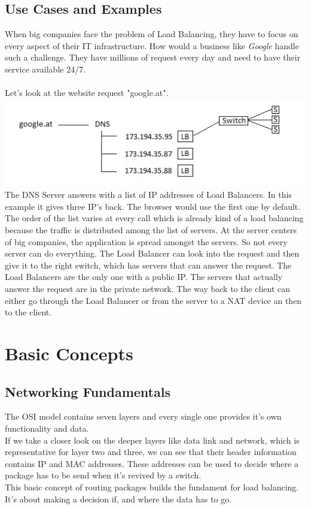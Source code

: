 \documentclass[12p]{article}
\begin{document}
	\subsection{Use Cases and Examples}
	When big companies face the problem of Load Balancing, they have to focus on every aspect of their IT infrastructure. How would a business like \textit{Google} handle such a challenge. They have millions of request every day and need to have their service available 24/7. \\\\
	Let's look at the website request "google.at".\\
	\includegraphics[width=\textwidth]{example}
 	The DNS Server answers with a list of IP addresses of Load Balancers. In this example it gives three IP's back. The browser would use the first one by default. The order of the list varies at every call which is already kind of a load balancing because the traffic is distributed among the list of servers. At the server centers of big companies, the application is spread amongst the servers. So not every server can do everything. The Load Balancer can look into the request and then give it to the right switch, which has servers that can answer the request. The Load Balancers are the only one with a public IP. The servers that actually answer the request are in the private network. The way back to the client can either go through the Load Balancer or from the server to a NAT device an then to the client.
	
	\newpage
	\section{Basic Concepts}
	\subsection{Networking Fundamentals}
	The OSI model contains seven layers and every single one provides it's own functionality and data.\\
	If we take a closer look on the deeper layers like data link and network, which is representative for layer two and three, we can see that their header information contains IP and MAC addresses. These addresses can be used to decide where a package has to be send when it's revived by a switch.\\
	This basic concept of routing packages builds the fundament for load balancing. It's about making a decision if, and where the data has to go. \cite{lb_SFC}
	
\end{document}
